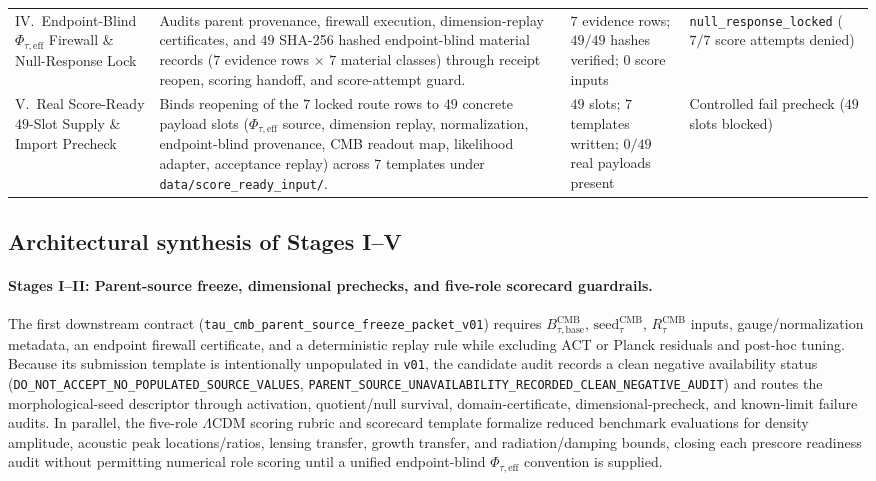 \documentclass[11pt]{article}
\begin{document}
\begin{table}[ht!]
\begin{tabularx}{\textwidth}{@{}>{ \raggedright\arraybackslash }p{2.7cm} >{ \raggedright\arraybackslash }X >{ \raggedright\arraybackslash }p{2.5cm} >{ \raggedright\arraybackslash }p{3.0cm}@{}}
IV.\ Endpoint-Blind $\Phi_{\tau,\mathrm{eff}}$ Firewall \& Null-Response Lock & Audits parent provenance, firewall execution, dimension-replay certificates, and $49$ SHA-256 hashed endpoint-blind material records ($7$ evidence rows $\times$ $7$ material classes) through receipt reopen, scoring handoff, and score-attempt guard. & $7$ evidence rows; $49/49$ hashes verified; $0$ score inputs & \texttt{null\_\allowbreak{}response\_\allowbreak{}locked} ($7/7$ score attempts denied) \\
V.\ Real Score-Ready $49$-Slot Supply \& Import Precheck & Binds reopening of the $7$ locked route rows to $49$ concrete payload slots ($\Phi_{\tau,\mathrm{eff}}$ source, dimension replay, normalization, endpoint-blind provenance, CMB readout map, likelihood adapter, acceptance replay) across $7$ templates under \texttt{data/score\_ready\_input/}. & $49$ slots; $7$ templates written; $0/49$ real payloads present & Controlled fail precheck ($49$ slots blocked) \\
\bottomrule
\end{tabularx}
\end{table}

\subsection{Architectural synthesis of Stages I--V}

\paragraph{Stages I--II: Parent-source freeze, dimensional prechecks, and five-role scorecard guardrails.}
The first downstream contract (\texttt{tau\_cmb\_parent\_source\_freeze\_packet\_v01})
requires $B_{\tau,\mathrm{base}}^{\mathrm{CMB}}$, $\mathrm{seed}_\tau^{\mathrm{CMB}}$,
$R_\tau^{\mathrm{CMB}}$ inputs, gauge/normalization metadata, an endpoint
firewall certificate, and a deterministic replay rule while excluding ACT or
Planck residuals and post-hoc tuning. Because its submission template is
intentionally unpopulated in \texttt{v01}, the candidate audit records a clean
negative availability status (\texttt{DO\_\allowbreak{}NOT\_\allowbreak{}ACCEPT\_\allowbreak{}NO\_\allowbreak{}POPULATED\_\allowbreak{}SOURCE\_\allowbreak{}VALUES},
\texttt{PARENT\_\allowbreak{}SOURCE\_\allowbreak{}UNAVAILABILITY\_\allowbreak{}RECORDED\_\allowbreak{}CLEAN\_\allowbreak{}NEGATIVE\_\allowbreak{}AUDIT}) and
routes the morphological-seed descriptor through activation, quotient/null
survival, domain-certificate, dimensional-precheck, and known-limit failure
audits. In parallel, the five-role $\Lambda$CDM scoring rubric and scorecard
template formalize reduced benchmark evaluations for density amplitude,
acoustic peak locations/ratios, lensing transfer, growth transfer, and
radiation/damping bounds, closing each prescore readiness audit without
permitting numerical role scoring until a unified endpoint-blind
$\Phi_{\tau,\mathrm{eff}}$ convention is supplied.
\end{document}
